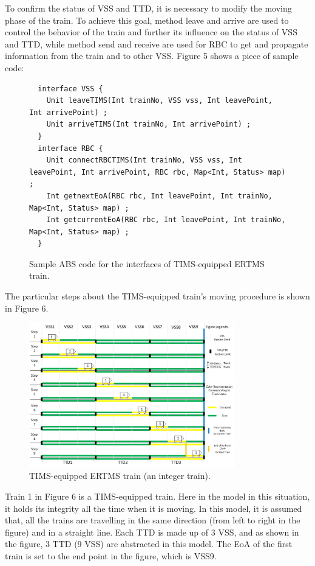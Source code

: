 \documentclass[article,dr=phil,type=msc,colorback,accentcolor=tud9c]{tudthesis}
\begin{document}
  To confirm the status of VSS and TTD, it is necessary to modify the moving phase of the train. To achieve this goal, method leave and arrive are used to control the behavior of the train and further its influence on the status of VSS and TTD, while method send and receive are used for RBC to get and propagate information from the train and to other VSS. Figure 5 shows a piece of sample code:
  
  \begin{figure}[H]
  	\begin{lstlisting}  	
  interface VSS {
  	Unit leaveTIMS(Int trainNo, VSS vss, Int leavePoint, Int arrivePoint) ;
  	Unit arriveTIMS(Int trainNo, Int arrivePoint) ;
  }  
  interface RBC {  
  	Unit connectRBCTIMS(Int trainNo, VSS vss, Int leavePoint, Int arrivePoint, RBC rbc, Map<Int, Status> map) ;  
  	Int getnextEoA(RBC rbc, Int leavePoint, Int trainNo, Map<Int, Status> map) ;
  	Int getcurrentEoA(RBC rbc, Int leavePoint, Int trainNo, Map<Int, Status> map) ;  
  }\end{lstlisting}
  	\caption[Caption for LOF]{Sample ABS code for the interfaces of TIMS-equipped ERTMS train.}
  \end{figure}
  
  The particular steps about the TIMS-equipped train's moving procedure is shown in Figure 6.
    
  \begin{figure}[H]
  	 \begin{center}
  	 	\includegraphics[width=0.8\textwidth]{train1}
  	 	\caption[Caption for LOF]{TIMS-equipped ERTMS train (an integer train).}
  	 \end{center}
  \end{figure}

  Train 1 in Figure 6 is a TIMS-equipped train. Here in the model in this situation, it holds its integrity all the time when it is moving. In this model, it is assumed that, all the trains are travelling in the same direction (from left to right in the figure) and in a straight line. Each TTD is made up of 3 VSS, and as shown in the figure, 3 TTD (9 VSS) are abstracted in this model. The EoA of the first train is set to the end point in the figure, which is VSS9.
\end{document}
